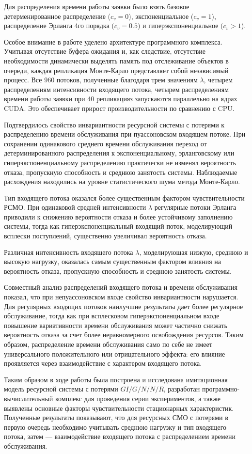 Для распределения времени работы заявки было взять базовое детерменированное распределение ($c_v = 0$), экспоненциальное ($c_v = 1$), распределение Эрланга 4го порядка ($c_v = 0.5$) и гиперэкспоненциальное ($c_v > 1$). 

Особое внимание в работе уделено архитектуре программного комплекса. Учитывая отсутствие буфера ожидания и, как следствие, отсутствие необходимости динамически выделять память под отслеживание объектов в очереди, каждая репликация Монте-Карло представляет собой независимый процесс. Все $960$ потоков, полученные благодаря трем значениям $\lambda$, четырем распределениям интенсивности входящего потока, четырем распределениям времени работы заявки при 40 репликацияз  запускаются параллельно на ядрах CUDA. Это обеспечивает прирост производительности по сравнению с CPU. 

Подтвердилось свойство инвариантности ресурсной системы с потерями к распределению времени обслуживания при пуассоновском входящем потоке. При сохранении одинакового среднего времени обслуживания переход от детерминированного распределения к экспоненциальному, эрланговскому или гиперэкспоненциальному распределению практически не изменял вероятность отказа, пропускную способность и среднюю занятость системы. Наблюдаемые расхождения находились на уровне статистического шума метода Монте-Карло.

Тип входящего потока оказался более существенным фактором чувствительности РСМО. При одинаковой средней интенсивности $\lambda$ регулярные потоки Эрланга приводили к снижению вероятности отказа и более устойчивому заполнению системы, тогда как гиперэкспоненциальный входящий поток, моделирующий всплески поступлений, существенно увеличивал вероятность отказа. 

Различная интенсивность входящего потока $\lambda$, моделирующая низкую, среднюю и высокую нагрузку, оказалась самым существенным фактором влияния на вероятность отказа, пропускную способность и среднюю занятость системы. 

Совместный анализ распределений входящего потока и времени обслуживания показал, что при непуассоновском входе свойство инвариантности нарушается. Для регулярных входящих потоков наилучшие результаты дает более регулярное обслуживание, тогда как при всплесковом гиперэкспоненциальном входе повышение вариативности времени обслуживания может частично снижать вероятность отказа за счет более неравномерного освобождения ресурсов. Таким образом, распределение времени обслуживания само по себе не имеет универсального положительного или отрицательного эффекта: его влияние проявляется через взаимодействие с характером входящего потока.

Таким образом в ходе работы была построена и исследована имитационная модель ресурсной системы с потерями $GI/G/N/N/R$, разработан программно-вычислительный комплекс для проведения серии экспериментов, а также выявлены основные факторы чувствительности стационарных характеристик. Полученные результаты показывают, что для ресурсных СМО с потерями в первую очередь необходимо учитывать среднюю нагрузку и тип входящего потока, затем --- взаимодействие входящего потока с распределением времени обслуживания. 




